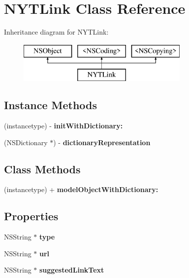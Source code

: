 \section{N\+Y\+T\+Link Class Reference}
\label{interface_n_y_t_link}
Inheritance diagram for N\+Y\+T\+Link\+:\begin{figure}[H]
\begin{center}
\leavevmode
\includegraphics[height=2.000000cm]{interface_n_y_t_link}
\end{center}
\end{figure}
\subsection*{Instance Methods}
\begin{DoxyCompactItemize}
\item 
(instancetype) -\/ {\bfseries init\+With\+Dictionary\+:}\label{interface_n_y_t_link_a8e748fb5b33676541c0cd27165b71816}

\item 
(N\+S\+Dictionary $\ast$) -\/ {\bfseries dictionary\+Representation}\label{interface_n_y_t_link_a9684d779ae978f5468605988d4056f55}

\end{DoxyCompactItemize}
\subsection*{Class Methods}
\begin{DoxyCompactItemize}
\item 
(instancetype) + {\bfseries model\+Object\+With\+Dictionary\+:}\label{interface_n_y_t_link_ace7722cee5ea029d539ab71e4df21247}

\end{DoxyCompactItemize}
\subsection*{Properties}
\begin{DoxyCompactItemize}
\item 
N\+S\+String $\ast$ {\bfseries type}\label{interface_n_y_t_link_a1e407ea02302f1235193feb690ce9e8d}

\item 
N\+S\+String $\ast$ {\bfseries url}\label{interface_n_y_t_link_a9f37db8c7eece3ef6a32ca948a529d1e}

\item 
N\+S\+String $\ast$ {\bfseries suggested\+Link\+Text}\label{interface_n_y_t_link_a0dd4c35216fcd9b92093cf0b50efc8b2}

\end{DoxyCompactItemize}


